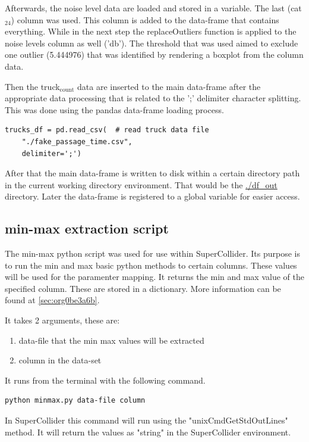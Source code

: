 \documentclass[11pt]{article}
\begin{document}
Afterwards, the noise level data are loaded and stored in a variable.  The last (cat\(_{\text{24}}\)) column was used.  This column is added to the data-frame that contains everything.  While in the next step the replaceOutliers function is applied to the noise levels column as well ('db').  The threshold that was used aimed to exclude one outlier (5.444976) that was identified by rendering a boxplot from the column data.

Then the truck\(_{\text{count}}\) data are inserted to the main data-frame after the appropriate data processing that is related to the ';' delimiter character splitting. This was done using the pandas data-frame loading process.

\begin{verbatim}
trucks_df = pd.read_csv(  # read truck data file
    "./fake_passage_time.csv",
    delimiter=';')
\end{verbatim}

After that the main data-frame is written to disk within a certain directory path in the current working directory environment.  That would be the \url{./df\_out} directory.
Later the data-frame is registered to a global variable for easier access.

\subsection{min-max extraction script}
\label{sec:orgd086aa3}
The min-max python script was used for use within SuperCollider.  Its purpose is to run the min and max basic python methods to certain columns.  These values will be used for the paramenter mapping.  It returns the min and max value of the specified column.  These are stored in a dictionary.  More information can be found at  \ref{sec:org0be3a6b}.

It takes 2 arguments, these are:
\begin{enumerate}
\item data-file that the min max values will be extracted
\item column in the data-set
\end{enumerate}

It runs from the terminal with the following command.
\begin{verbatim}
python minmax.py data-file column
\end{verbatim}

In SuperCollider this command will run using the "unixCmdGetStdOutLines" method.  It will return the values as "string" in the SuperCollider environment.
\end{document}
